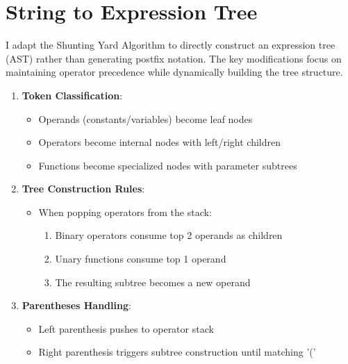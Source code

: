 \documentclass{report}
\begin{document}
\section{String to Expression Tree}
I adapt the Shunting Yard Algorithm to directly construct an expression tree (AST) rather than generating postfix notation. The key modifications focus on maintaining operator precedence while dynamically building the tree structure.

\begin{enumerate}
    \item \textbf{Token Classification}:
    \begin{itemize}
        \item Operands (constants/variables) become leaf nodes
        \item Operators become internal nodes with left/right children
        \item Functions become specialized nodes with parameter subtrees
    \end{itemize}
    
    \item \textbf{Tree Construction Rules}:
    \begin{itemize}
        \item When popping operators from the stack:
        \begin{enumerate}
            \item Binary operators consume top 2 operands as children
            \item Unary functions consume top 1 operand
            \item The resulting subtree becomes a new operand
        \end{enumerate}
    \end{itemize}
    
    \item \textbf{Parentheses Handling}:
    \begin{itemize}
        \item Left parenthesis pushes to operator stack
        \item Right parenthesis triggers subtree construction until matching '('
    \end{itemize}
\end{enumerate}
\end{document}
